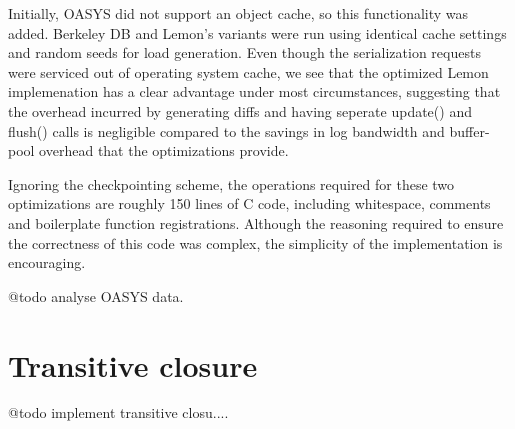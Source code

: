 \documentclass[letterpaper,twocolumn,english]{article}
\newcommand{\yad}{Lemon\xspace}
\begin{document}
Initially, OASYS did not support an object cache, so this
functionality was added.  Berkeley DB and \yad's variants were run
using identical cache settings and random seeds for load generation.
Even though the serialization requests were serviced out of operating
system cache, we see that the optimized \yad implemenation has a
clear advantage under most circumstances, suggesting that the overhead
incurred by generating diffs and having seperate update() and flush()
calls is negligible compared to the savings in log bandwidth and
buffer-pool overhead that the optimizations provide.

Ignoring the checkpointing scheme, the operations required for these
two optimizations are roughly 150 lines of C code, including
whitespace, comments and boilerplate function registrations.  Although
the reasoning required to ensure the correctness of this code was
complex, the simplicity of the implementation is encouraging.

@todo analyse OASYS data.

\section{Transitive closure\label{TransClos}}

@todo implement transitive closu....

%
%
%
%    
% 
%
%
%
%
%
%    
%
%
\end{document}
